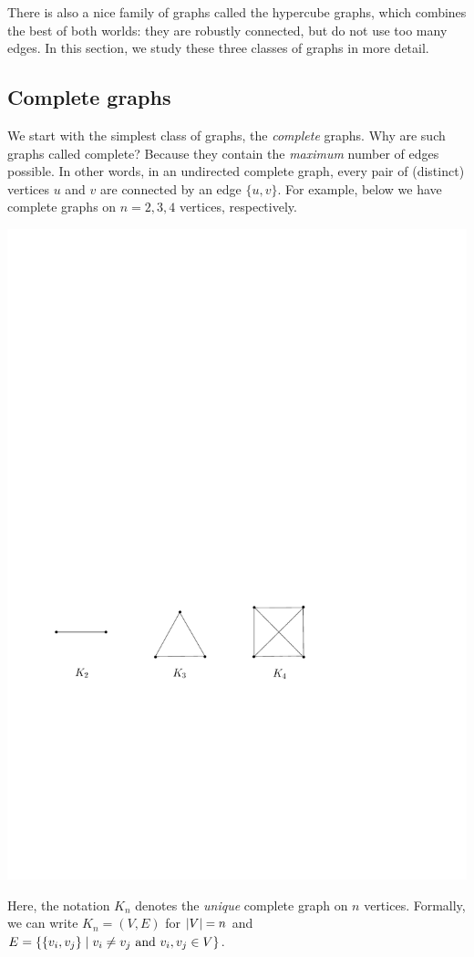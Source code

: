 \documentclass[11pt]{article}
\begin{document}
There is also a nice family of graphs called the hypercube graphs, which combines the best of both worlds: they are robustly connected, but do not use too many edges. In this section, we study these three classes of graphs in more detail.

\subsection{Complete graphs}\label{scn:complete}

We start with the simplest class of graphs, the \emph{complete} graphs. Why are such graphs called complete? Because they contain the \emph{maximum} number of edges possible. In other words, in an undirected complete graph, every pair of (distinct) vertices $u$ and $v$ are connected by an edge $\{u,v\}$. For example, below we have complete graphs on $n=2,3,4$ vertices, respectively.
\begin{center}
\includegraphics[scale=0.7]{complete.pdf}
\end{center}
Here, the notation $K_n$ denotes the \emph{unique} complete graph on $n$ vertices.  Formally, we can write $K_n=(V,E)$ for $\left\lvert V \right\rvert=n$ and $E={\left\{\{v_i,v_j\}\mid v_i\neq v_j \text{ and }v_i,v_j\in V\right\}}$.
\end{document}
